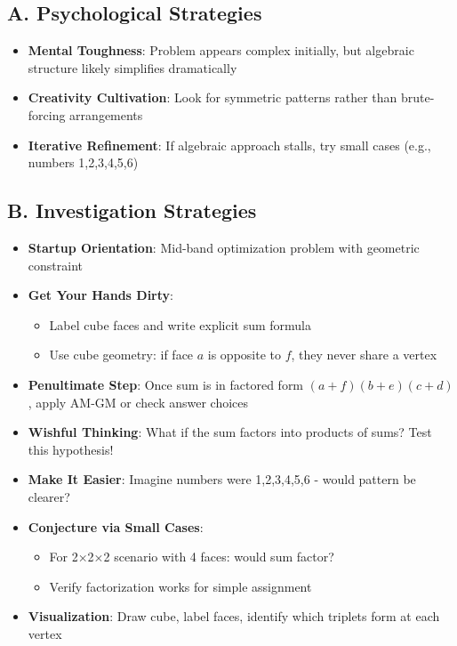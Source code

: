 \documentclass[]{article}
\begin{document}
\begin{strategicbox}
\subsection*{A. Psychological Strategies}
\begin{itemize}[leftmargin=*]
    \item \textbf{Mental Toughness}: Problem appears complex initially, but algebraic structure likely simplifies dramatically
    \item \textbf{Creativity Cultivation}: Look for symmetric patterns rather than brute-forcing arrangements
    \item \textbf{Iterative Refinement}: If algebraic approach stalls, try small cases (e.g., numbers 1,2,3,4,5,6)
\end{itemize}

\subsection*{B. Investigation Strategies}
\begin{itemize}[leftmargin=*]
    \item \textbf{Startup Orientation}: Mid-band optimization problem with geometric constraint
    \item \textbf{Get Your Hands Dirty}: 
    \begin{itemize}
        \item Label cube faces and write explicit sum formula
        \item Use cube geometry: if face $a$ is opposite to $f$, they never share a vertex
    \end{itemize}
    \item \textbf{Penultimate Step}: Once sum is in factored form $(a+f)(b+e)(c+d)$, apply AM-GM or check answer choices
    \item \textbf{Wishful Thinking}: What if the sum factors into products of sums? Test this hypothesis!
    \item \textbf{Make It Easier}: Imagine numbers were 1,2,3,4,5,6 - would pattern be clearer?
    \item \textbf{Conjecture via Small Cases}: 
    \begin{itemize}
        \item For 2×2×2 scenario with 4 faces: would sum factor?
        \item Verify factorization works for simple assignment
    \end{itemize}
    \item \textbf{Visualization}: Draw cube, label faces, identify which triplets form at each vertex
\end{itemize}


\end{strategicbox}
\end{document}
